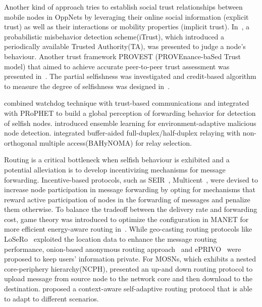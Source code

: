 Another kind of approach tries to establish social trust relationships
between mobile nodes in OppNets by leveraging their online social information
(explicit trust) as well as their interactions or mobility properties (implicit trust).
In~\cite{DBLP:journals/tpds/ZhuDGDC14}, a probabilistic misbehavior detection scheme(iTrust),
which introduced a periodically available Trusted Authority(TA),
was presented to judge a node's behaviour.
Another trust framework PROVEST (PROVEnance-baSed Trust model)
that aimed to achieve accurate peer-to-peer trust assessment was presented
in~\cite{DBLP:journals/tdsc/ChoC18}.
The partial selfishness was investigated and credit-based algorithm to
measure the degree of selfishness was designed in~\cite{DBLP:journals/tmc/ChoiSLW12}.

\cite{DBLP:journals/jnca/BasuBRB18} combined watchdog technique
with trust-based communications and integrated with PRoPHET
to build a global perception of forwarding behavior for detection of selfish nodes.
\cite{DBLP:conf/icdcs/GaoMAH18} introduced ensemble learning
for environment-adaptive malicious node detection.
\cite{DBLP:journals/tvt/NomikosCVWK20} integrated
buffer-aided full-duplex/half-duplex relaying with
non-orthogonal multiple access(BAHyNOMA) for relay selection.

Routing is a critical bottleneck when selfish behaviour
is exhibited and a potential alleviation is to
develop incentivizing mechanisms for message forwarding.
Incentive-based protocols, such as SEIR~\cite{DBLP:conf/ciss/ChhabraVS17},
Multicent~\cite{DBLP:journals/tpds/ChenSY15},
were devised to increase node participation in message forwarding
by opting for mechanisms that reward active participation of nodes
in the forwarding of messages and penalize them otherwise.
To balance the tradeoff between the delivery rate and forwarding cost,
game theory was introduced to optimize the configuration in MANET
for more efficient energy-aware routing in~\cite{DBLP:journals/monet/MaoZ15}.
While geo-casting routing protocols like LoSeRo~\cite{DBLP:journals/tmc/CostantinoMMS20}
exploited the location data to enhance the message routing performance,
onion-based anonymous routing approach~\cite{DBLP:conf/icdcs/SakaiSKWA16}
and ePRIVO~\cite{DBLP:journals/tvt/MagaiaBPC18} were proposed
to keep users' information private.
For MOSNs, which exhibits a nested core-periphery hierarchy(NCPH),
\cite{DBLP:journals/tvt/Zheng017} presented an up-and down routing protocol
to upload message from source node to the network core
and then download to the destination.
\cite{DBLP:journals/adhoc/RosasGH20} proposed
a context-aware self-adaptive routing protocol
that is able to adapt to different scenarios.


